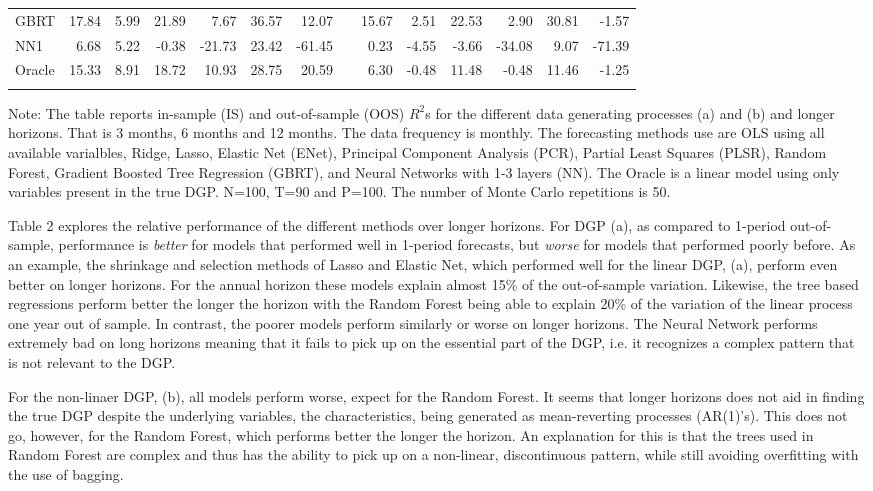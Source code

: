 \documentclass[11pt]{article}
\begin{document}
\begin{table}[ht]
\begin{threeparttable}
\begin{tabular}{lrrrrrrcrrrrrr}
GBRT & 17.84 & 5.99 & 21.89 & 7.67 & 36.57 & 12.07 && 15.67 & 2.51 & 22.53 & 2.90 & 30.81 & -1.57 \\ 
NN1 & 6.68 & 5.22 & -0.38 & -21.73 & 23.42 & -61.45 && 0.23 & -4.55 & -3.66 & -34.08 & 9.07 & -71.39 \\ 
Oracle & 15.33 & 8.91 & 18.72 & 10.93 & 28.75 & 20.59 && 6.30 & -0.48 & 11.48 & -0.48 & 11.46 & -1.25 \\ 
  \Xhline{2\arrayrulewidth}
\end{tabular}
\begin{tablenotes}
      \small
      \item Note: The table reports in-sample (IS) and out-of-sample (OOS) $R^2$s for the different data generating processes (a) and (b) and longer horizons. That is 3 months, 6 months and 12 months. The data frequency is monthly. The forecasting methods use are OLS using all available varialbles, Ridge, Lasso, Elastic Net (ENet), Principal Component Analysis (PCR), Partial Least Squares (PLSR), Random Forest, Gradient Boosted Tree Regression (GBRT), and Neural Networks with 1-3 layers (NN). The Oracle is a linear model using only variables present in the true DGP. N=100, T=90 and P=100. The number of Monte Carlo repetitions is 50.
    \end{tablenotes}
  \end{threeparttable}
\label{table:horizon}
\end{table}

Table 2 explores the relative performance of the different methods over
longer horizons. For DGP (a), as compared to 1-period out-of-sample,
performance is \emph{better} for models that performed well in 1-period
forecasts, but \emph{worse} for models that performed poorly before. As
an example, the shrinkage and selection methods of Lasso and Elastic
Net, which performed well for the linear DGP, (a), perform even better
on longer horizons. For the annual horizon these models explain almost
15\% of the out-of-sample variation. Likewise, the tree based
regressions perform better the longer the horizon with the Random Forest
being able to explain 20\% of the variation of the linear process one
year out of sample. In contrast, the poorer models perform similarly or
worse on longer horizons. The Neural Network performs extremely bad on
long horizons meaning that it fails to pick up on the essential part of
the DGP, i.e. it recognizes a complex pattern that is not relevant to the DGP.

For the non-linaer DGP, (b), all models perform worse, expect for the
Random Forest. It seems that longer horizons does not aid in finding the
true DGP despite the underlying variables, the characteristics, being
generated as mean-reverting processes (AR(1)'s). This does not go,
however, for the Random Forest, which performs better the longer the
horizon. An explanation for this is that the trees used in Random Forest
are complex and thus has the ability to pick up on a non-linear,
discontinuous pattern, while still avoiding overfitting with the use of
bagging.
\end{document}
